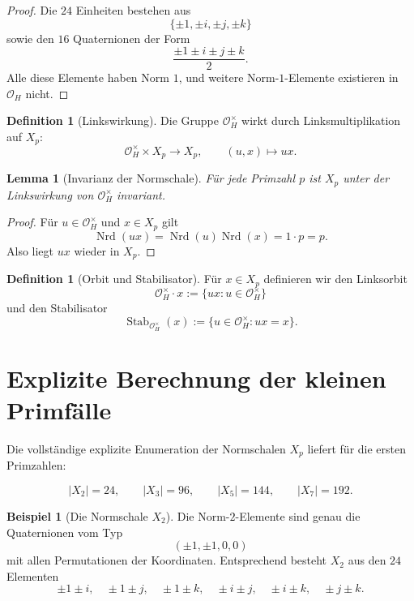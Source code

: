 \documentclass[12pt,a4paper]{article}
\theoremstyle{plain}
\newtheorem{lemma}[satz]{Lemma}
\theoremstyle{definition}
\newtheorem{definition}[satz]{Definition}
\newtheorem{beispiel}[satz]{Beispiel}
\theoremstyle{remark}
\newcommand{\OH}{\mathcal O_H}
\newcommand{\nrd}{\operatorname{Nrd}}
\newcommand{\Stab}{\operatorname{Stab}}
\begin{document}
	\begin{proof}
		Die \(24\) Einheiten bestehen aus
		\[
		\{\pm1,\pm i,\pm j,\pm k\}
		\]
		sowie den \(16\) Quaternionen der Form
		\[
		\frac{\pm1\pm i\pm j\pm k}{2}.
		\]
		Alle diese Elemente haben Norm \(1\), und weitere Norm-\(1\)-Elemente existieren in \(\OH\) nicht.
	\end{proof}
	
	\begin{definition}[Linkswirkung]
		Die Gruppe \(\OH^\times\) wirkt durch Linksmultiplikation auf \(X_p\):
		\[
		\OH^\times\times X_p\to X_p,\qquad (u,x)\mapsto ux.
		\]
	\end{definition}
	
	\begin{lemma}[Invarianz der Normschale]
		Für jede Primzahl \(p\) ist \(X_p\) unter der Linkswirkung von \(\OH^\times\) invariant.
	\end{lemma}
	
	\begin{proof}
		Für \(u\in \OH^\times\) und \(x\in X_p\) gilt
		\[
		\nrd(ux)=\nrd(u)\nrd(x)=1\cdot p=p.
		\]
		Also liegt \(ux\) wieder in \(X_p\).
	\end{proof}
	
	\begin{definition}[Orbit und Stabilisator]
		Für \(x\in X_p\) definieren wir den Linksorbit
		\[
		\OH^\times\cdot x:=\{ux:u\in \OH^\times\}
		\]
		und den Stabilisator
		\[
		\Stab_{\OH^\times}(x):=\{u\in \OH^\times:ux=x\}.
		\]
	\end{definition}
	
	\section{Explizite Berechnung der kleinen Primfälle}
	
	Die vollständige explizite Enumeration der Normschalen \(X_p\) liefert für die ersten Primzahlen:
	
	\[
	|X_2|=24,\qquad |X_3|=96,\qquad |X_5|=144,\qquad |X_7|=192.
	\]
	
	\begin{beispiel}[Die Normschale \(X_2\)]
		Die Norm-\(2\)-Elemente sind genau die Quaternionen vom Typ
		\[
		(\pm1,\pm1,0,0)
		\]
		mit allen Permutationen der Koordinaten. Entsprechend besteht \(X_2\) aus den \(24\) Elementen
		\[
		\pm1\pm i,\quad \pm1\pm j,\quad \pm1\pm k,\quad
		\pm i\pm j,\quad \pm i\pm k,\quad \pm j\pm k.
		\]
	\end{beispiel}
	
\end{document}
